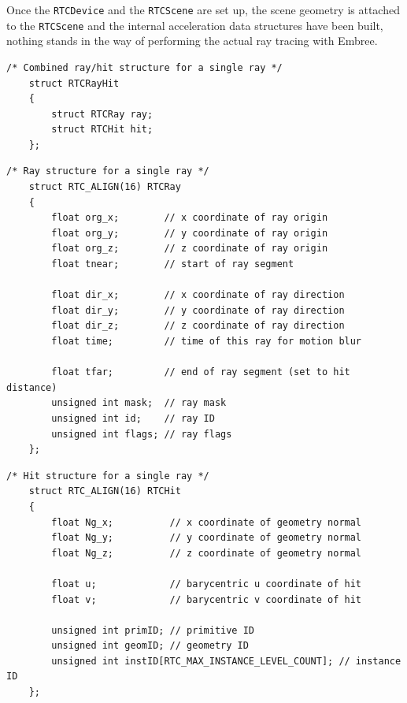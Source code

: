 Once the \texttt{RTCDevice} and the \texttt{RTCScene} are set up, the scene geometry is attached to the \texttt{RTCScene} and the internal acceleration data structures have been built, nothing stands in the way of performing the actual ray tracing with Embree. 

\begin{listing} 
	\begin{lstlisting}[caption={The \texttt{RTCRayHit} struct. The segment of code displayed here is part of the original Embree source code.}, label={lst:rtc_ray_hit}]
	/* Combined ray/hit structure for a single ray */
	struct RTCRayHit
	{
		struct RTCRay ray;
		struct RTCHit hit;
	};
	\end{lstlisting}
\end{listing}

\begin{listing} 
	\begin{lstlisting}[caption={The \texttt{RTCRay} struct. The segment of code displayed here is part of the original Embree source code.}, label={lst:rtc_ray}]
	/* Ray structure for a single ray */
	struct RTC_ALIGN(16) RTCRay
	{
		float org_x;        // x coordinate of ray origin
		float org_y;        // y coordinate of ray origin
		float org_z;        // z coordinate of ray origin
		float tnear;        // start of ray segment
		
		float dir_x;        // x coordinate of ray direction
		float dir_y;        // y coordinate of ray direction
		float dir_z;        // z coordinate of ray direction
		float time;         // time of this ray for motion blur
		
		float tfar;         // end of ray segment (set to hit distance)
		unsigned int mask;  // ray mask
		unsigned int id;    // ray ID
		unsigned int flags; // ray flags
	};
	\end{lstlisting}
\end{listing}

\begin{listing} 
	\begin{lstlisting}[caption={The \texttt{RTCHit} struct.The segment of code displayed here is part of the original Embree source code.}, label={lst:rtc_hit}]
	/* Hit structure for a single ray */
	struct RTC_ALIGN(16) RTCHit
	{
		float Ng_x;          // x coordinate of geometry normal
		float Ng_y;          // y coordinate of geometry normal
		float Ng_z;          // z coordinate of geometry normal
		
		float u;             // barycentric u coordinate of hit
		float v;             // barycentric v coordinate of hit
		
		unsigned int primID; // primitive ID
		unsigned int geomID; // geometry ID
		unsigned int instID[RTC_MAX_INSTANCE_LEVEL_COUNT]; // instance ID
	};
	\end{lstlisting}
\end{listing}

